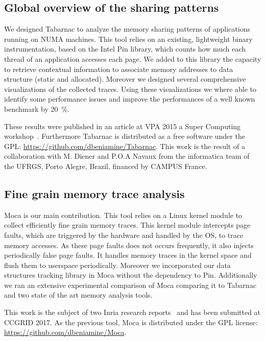 \subsection{Global overview of the sharing patterns}

We designed \gls{Tabarnac} to analyze the memory sharing patterns of applications running on \gls{NUMA} machines.
This tool relies on an existing, lightweight binary instrumentation, based on the \gls{Intel} \gls{Pin} library, which counts how much each thread of an application accesses each page.
We added to this library the capacity to retrieve contextual information to associate memory addresses to data structure (static and allocated).
Moreover we designed several comprehensive visualizations of the collected traces.
Using these visualizations we where able to identify some performance issues and improve the performances of a well known benchmark by \SI{20}{\%}.

These results were published in an article at \gls{VPA} 2015 a Super Computing workshop~\cite{Beniamine15TABARNAC}.
Furthermore \gls{Tabarnac} is distributed as a free software under the \gls{GPL}: \url{https://github.com/dbeniamine/Tabarnac}.
This work is the result of a collaboration with M. Diener and P.O.A Navaux from the informatica team of the \gls{UFRGS}, Porto Alegre, Brazil, financed by CAMPUS France.

\subsection{Fine grain memory trace analysis}

\gls{Moca} is our main contribution.
This tool relies on a \gls{Linux} kernel module to collect efficiently fine grain memory traces.
This kernel module intercepts page faults, which are triggered by the hardware and handled by the \gls{OS}, to trace memory accesses.
As these page faults does not occurs frequently, it also injects periodically false page faults.
It handles memory traces in the kernel space and flush them to userspace periodically.
Moreover we incorporated our data structures tracking library in \gls{Moca} without the dependency to \gls{Pin}.
Additionally we ran an extensive experimental comparison of \gls{Moca} comparing it to \gls{Tabarnac} and two state of the art memory analysis tools.

This work is the subject of two Inria research reports~\cite{Beniamine15Memory,Beniamine16Moca} and has been submitted at \gls{CCGRID} 2017.
As the previous tool, \gls{Moca} is distributed under the \gls{GPL} license:\\
\url{https://github.com/dbeniamine/Moca}.

